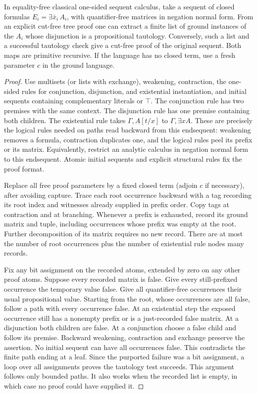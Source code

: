 \begin{theorem}
\label{thm:herbrand}
In equality-free classical one-sided sequent calculus, take a sequent of closed formulas $E_i=\exists\bar x_i\,A_i$, with quantifier-free matrices in negation normal form. From an explicit cut-free tree proof one can extract a finite list of ground instances of the $A_i$ whose disjunction is a propositional tautology. Conversely, such a list and a successful tautology check give a cut-free proof of the original sequent. Both maps are primitive recursive. If the language has no closed term, use a fresh parameter $c$ in the ground language.
\end{theorem}
\begin{proof}
Use multisets (or lists with exchange), weakening, contraction, the one-sided rules for conjunction, disjunction, and existential instantiation, and initial sequents containing complementary literals or $\top$. The conjunction rule has two premises with the same context. The disjunction rule has one premise containing both children. The existential rule takes $\Gamma,A[t/x]$ to $\Gamma,\exists x A$. These are precisely the logical rules needed on paths read backward from this endsequent: weakening removes a formula, contraction duplicates one, and the logical rules peel its prefix or its matrix. Equivalently, restrict an analytic calculus in negation normal form to this endsequent. Atomic initial sequents and explicit structural rules fix the proof format.

Replace all free proof parameters by a fixed closed term (adjoin $c$ if necessary), after avoiding capture. Trace each root occurrence backward with a tag recording its root index and witnesses already supplied in prefix order. Copy tags at contraction and at branching. Whenever a prefix is exhausted, record its ground matrix and tuple, including occurrences whose prefix was empty at the root. Further decomposition of its matrix requires no new record. There are at most the number of root occurrences plus the number of existential rule nodes many records.

Fix any bit assignment on the recorded atoms, extended by zero on any other proof atoms. Suppose every recorded matrix is false. Give every still-prefixed occurrence the temporary value false. Give all quantifier-free occurrences their usual propositional value. Starting from the root, whose occurrences are all false, follow a path with every occurrence false. At an existential step the exposed occurrence still has a nonempty prefix or is a just-recorded false matrix. At a disjunction both children are false. At a conjunction choose a false child and follow its premise. Backward weakening, contraction and exchange preserve the assertion. No initial sequent can have all occurrences false. This contradicts the finite path ending at a leaf. Since the purported failure was a bit assignment, a loop over all assignments proves the tautology test succeeds. This argument follows only bounded paths. It also works when the recorded list is empty, in which case no proof could have supplied it.


\end{proof}
